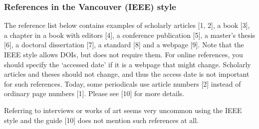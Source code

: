 \documentclass[english, 12pt, a4paper, biz, utf8, a-2b, online]{aaltothesis}
\begin{document}
\subsubsection*{References in the Vancouver (IEEE) style}

The reference list below contains examples of scholarly articles [1, 2], a book 
[3], a chapter in a book with editors [4], a conference publication [5], a 
master’s thesis [6], a doctoral dissertation [7], a standard [8] and a webpage 
[9]. Note that the IEEE style allows DOIs, but does not require them. For online
references, you should specify the ‘accessed date’ if it is a webpage that might
change. Scholarly articles and theses should not change, and thus the access 
date is not important for such references. Today, some periodicals use article 
numbers [2] instead of ordinary page numbers [1]. Please see [10] for more 
details.

Referring to interviews or works of art seems very uncommon using the IEEE style
and the guide [10] does not mention such references at all.
\end{document}
